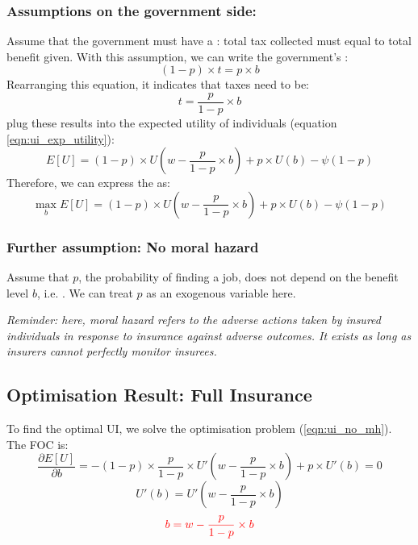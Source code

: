             \subsubsection{Assumptions on the government side:}
                Assume that the government must have a : total tax collected must equal to total benefit given. With this assumption, we can write the government's :
                $$(1-p)\times{t} = p\times{b}$$
                Rearranging this equation, it indicates that taxes need to be:
                $$t = \frac{p}{1-p}\times{b}$$
                plug these results into the expected utility of individuals (equation \ref{eqn:ui_exp_utility}):
                $$E[U] = (1-p)\times{U(w-\frac{p}{1-p}\times{b})} + p\times{U(b)} - \psi(1-p)$$
                Therefore, we can express the  as:
                \begin{equation}
                    \label{eqn:ui_no_mh}
                    \max_{b} E[U] = (1-p)\times{U(w-\frac{p}{1-p}\times{b})} + p\times{U(b)} - \psi(1-p)
                    \end{equation}
                    
            \subsubsection{Further assumption: No moral hazard}
                Assume that $p$, the probability of finding a job, does not depend on the benefit level $b$, i.e. . We can treat $p$ as an exogenous variable here.
                
                \emph{Reminder: here, moral hazard refers to the adverse actions taken by insured individuals in response to insurance against adverse outcomes. It exists as long as insurers cannot perfectly monitor insurees.}
                
        \subsection{Optimisation Result: Full Insurance}
            To find the optimal UI, we solve the optimisation problem (\ref{eqn:ui_no_mh}). The FOC is:
            $$\frac{\partial E[U]}{\partial b}=-(1-p)\times{\frac{p}{1-p}}\times{U'(w-\frac{p}{1-p}\times{b})} + p\times{U'(b)} = 0$$
            $$U'(b) = U'(w-\frac{p}{1-p}\times{b})$$
            $$\color{red} b = w-\frac{p}{1-p}\times{b}$$
            

